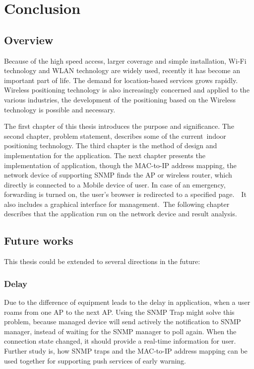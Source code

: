 \newpage
\chapter{Conclusion}

\section{Overview}

Because of the high speed access, larger coverage and simple installation, Wi-Fi technology and WLAN technology are widely used, recently it has become an important part of life. The demand for location-based services grows rapidly. Wireless positioning technology is also increasingly concerned and applied to the various industries, the development of the positioning based on the Wireless technology is possible and necessary.

The first chapter of this thesis introduces the purpose and significance. The second chapter, problem statement, describes some of the current indoor positioning technology. The third chapter is the method of design and implementation for the application. The next chapter presents the implementation of application, though the MAC-to-IP address mapping, the network device of supporting SNMP finds the AP or wireless router, which directly is connected to a Mobile device of user. In case of an emergency, forwarding is turned on, the user's browser is redirected to a specified page.  It also includes a graphical interface for management. The following chapter describes that the application run on the network device and result analysis.

\section{Future works}

This thesis could be extended to several directions in the future:

\subsection{Delay}

Due to the difference of equipment leads to the delay in application, when a user roams from one AP to the next AP. Using the SNMP Trap might solve this problem, because managed device will send actively the notification to SNMP manager, instead of waiting for the SNMP manager to poll again. When the connection state changed, it should provide a real-time information for user. Further study is, how SNMP traps and the MAC-to-IP address mapping can be used together for supporting push services of early warning.

